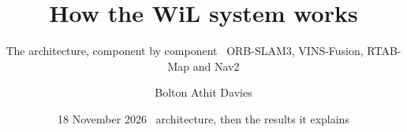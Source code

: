 \documentclass[11pt,aspectratio=169]{beamer}
\title{How the WiL system works}
\subtitle{The architecture, component by component \textperiodcentered\
  ORB-SLAM3, VINS-Fusion, RTAB-Map and Nav2}
\author{Bolton Athit Davies}
\date{18 November 2026 \textperiodcentered\ architecture, then the results it explains}
\begin{document}
\begin{frame}
  \titlepage
\end{frame}









\end{document}
